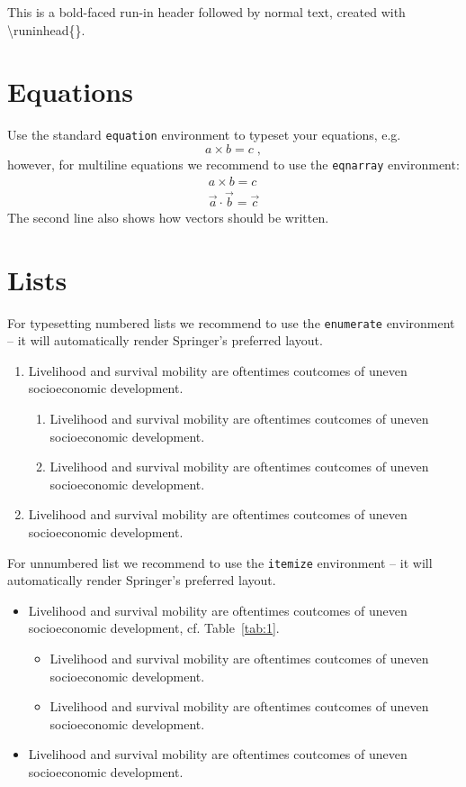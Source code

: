 \documentclass[graybox,natbib,nosecnum]{svmult}
\begin{document}
 This is a bold-faced run-in header followed by normal text, created with \textbackslash runinhead\{\}.

\section{Equations}
Use the standard \verb|equation| environment to typeset your equations, e.g.
%
\begin{equation}
a \times b = c\;,
\end{equation}
%
however, for multiline equations we recommend to use the \verb|eqnarray| environment:
\begin{eqnarray}
a \times b = c \nonumber\\
\vec{a} \cdot \vec{b}=\vec{c}
\label{eq:01}
\end{eqnarray}
The second line also shows how vectors should be written.

\section{Lists}
For typesetting numbered lists we recommend to use the \verb|enumerate| environment -- it will automatically render Springer's preferred layout.

\begin{enumerate}
\item{Livelihood and survival mobility are oftentimes coutcomes of uneven socioeconomic development.}
\begin{enumerate}
\item{Livelihood and survival mobility are oftentimes coutcomes of uneven socioeconomic development.}
\item{Livelihood and survival mobility are oftentimes coutcomes of uneven socioeconomic development.}
\end{enumerate}
\item{Livelihood and survival mobility are oftentimes coutcomes of uneven socioeconomic development.}
\end{enumerate}

For unnumbered list we recommend to use the \verb|itemize| environment -- it will automatically render Springer's preferred layout.

\begin{itemize}
\item{Livelihood and survival mobility are oftentimes coutcomes of uneven socioeconomic development, cf. Table~\ref{tab:1}.}
\begin{itemize}
\item{Livelihood and survival mobility are oftentimes coutcomes of uneven socioeconomic development.}
\item{Livelihood and survival mobility are oftentimes coutcomes of uneven socioeconomic development.}
\end{itemize}
\item{Livelihood and survival mobility are oftentimes coutcomes of uneven socioeconomic development.}
\end{itemize}
\end{document}
